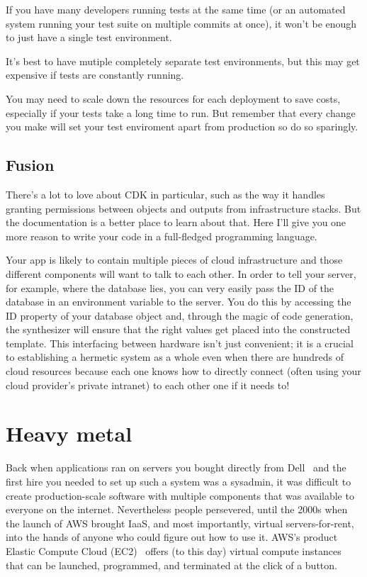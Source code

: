 \documentclass{article}
\newcommand{\infobox}[2]{
  \begin{tcolorbox}[width=\textwidth,colback={white},title={\strut\textbf{#1}},colbacktitle=blue!15,coltitle=black,boxrule=0.2pt,parbox=false]
    #2
  \end{tcolorbox}
}
\begin{document}
\infobox{More on remote tests}{
  If you have many developers running tests at the same time (or an automated system running your test suite on multiple commits at once), it won't be enough to just have a single test environment.

  It's best to have mutiple completely separate test environments, but this may get expensive if tests are constantly running.

  You may need to scale down the resources for each deployment to save costs, especially if your tests take a long time to run.
  But remember that every change you make will set your test enviroment apart from production so do so sparingly.
}

\subsection{Fusion}

There's a lot to love about CDK in particular, such as the way it handles granting permissions between objects and outputs from infrastructure stacks.
But the documentation is a better place to learn about that.
Here I'll give you one more reason to write your code in a full-fledged programming language.

Your app is likely to contain multiple pieces of cloud infrastructure and those different components will want to talk to each other.
In order to tell your server, for example, where the database lies, you can very easily pass the ID of the database in an environment variable to the server.
You do this by accessing the ID property of your database object and, through the magic of code generation, the synthesizer will ensure that the right values get placed into the constructed template.
This interfacing between hardware isn't just convenient; it is a crucial to establishing a hermetic system as a whole even when there are hundreds of cloud resources because each one knows how to directly connect (often using your cloud provider's private intranet) to each other one if it needs to!

\section{Heavy metal}

Back when applications ran on servers you bought directly from Dell~\cite{joel-dell} and the first hire you needed to set up such a system was a sysadmin, it was difficult to create production-scale software with multiple components that was available to everyone on the internet.
Nevertheless people persevered, until the 2000s when the launch of AWS brought IaaS, and most importantly, virtual servers-for-rent, into the hands of anyone who could figure out how to use it.
AWS's product Elastic Compute Cloud (EC2)~\cite{ec2} offers (to this day) virtual compute instances that can be launched, programmed, and terminated at the click of a button.
\end{document}
